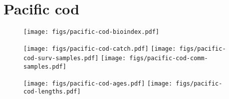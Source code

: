 \documentclass[12pt]{article}
\begin{document}
\clearpage

\section{Pacific cod}

\begin{figure}[h]
  \parbox{\textwidth}{
    \parbox{2.5in}{%
         \texttt{[image: figs/pacific-cod-bioindex.pdf]}
    }
    \parbox{3in}{%
       \texttt{[image: figs/pacific-cod-catch.pdf]}
       \texttt{[image: figs/pacific-cod-surv-samples.pdf]}
       \texttt{[image: figs/pacific-cod-comm-samples.pdf]}
    }}
    \texttt{[image: figs/pacific-cod-ages.pdf]}
    \texttt{[image: figs/pacific-cod-lengths.pdf]}
\end{figure}

\clearpage
\end{document}
